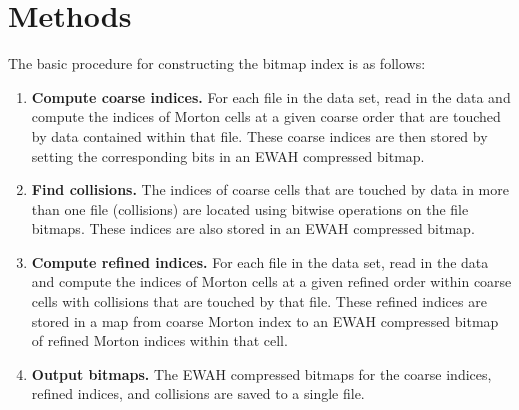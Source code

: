 \documentclass[apjl]{emulateapj}
\begin{document}
\section{Methods}\label{S:methods}
The basic procedure for constructing the bitmap index is as follows:
\begin{enumerate}
\item {\bf Compute coarse indices.} For each file in the data set, read in the data and compute the indices of Morton cells at a given coarse order that are touched by data contained within that file. These coarse indices are then stored by setting the corresponding bits in an EWAH compressed bitmap.
\item {\bf Find collisions.} The indices of coarse cells that are touched by data in more than one file (collisions) are located using bitwise operations on the file bitmaps. These indices are also stored in an EWAH compressed bitmap.
\item {\bf Compute refined indices.} For each file in the data set, read in the data and compute the indices of Morton cells at a given refined order within coarse cells with collisions that are touched by that file. These refined indices are stored in a map from coarse Morton index to an EWAH compressed bitmap of refined Morton indices within that cell.
\item {\bf Output bitmaps.} The EWAH compressed bitmaps for the coarse indices, refined indices, and collisions are saved to a single file.
\end{enumerate}
\end{document}

